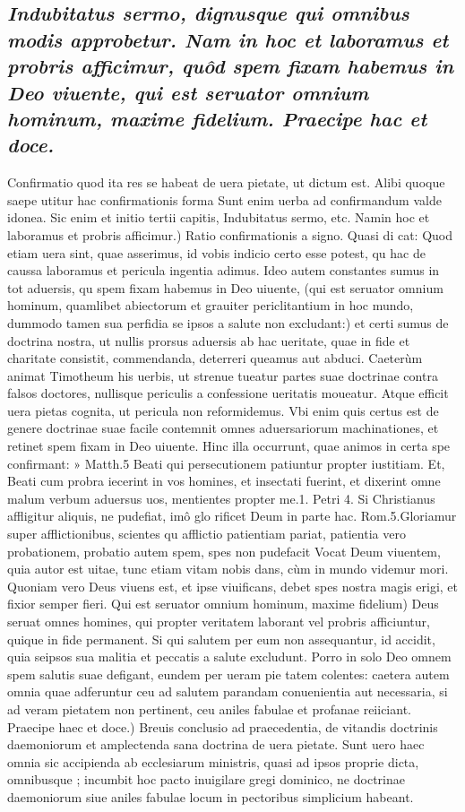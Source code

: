 \documentclass{article}
\begin{document}
\begin{pages}
\subsection*{\textit{Indubitatus sermo, dignusque qui omnibus modis approbetur. Nam in hoc et laboramus et probris afficimur, quôd spem fixam habemus in Deo viuente, qui est seruator omnium hominum, maxime fidelium. Praecipe hac et doce. }}\pstart Confirmatio quod ita res se habeat de uera pietate, ut dictum est. Alibi quoque saepe utitur hac confirmationis forma Sunt enim uerba ad confirmandum valde idonea. Sic enim et initio tertii capitis, Indubitatus sermo, etc.  \pend\pstart Namin hoc et laboramus et probris afficimur.) Ratio confirmationis a signo. Quasi di cat: Quod etiam uera sint, quae asserimus, id vobis indicio certo esse potest, qu hac de caussa laboramus et pericula ingentia adimus. Ideo autem constantes sumus in tot aduersis, qu spem fixam habemus in Deo uiuente, (qui est seruator omnium hominum, quamlibet abiectorum et grauiter periclitantium in hoc mundo, dummodo tamen sua perfidia se ipsos a salute non excludant:) et certi sumus de doctrina nostra, ut nullis prorsus aduersis ab hac ueritate, quae in fide et charitate consistit, commendanda, deterreri queamus aut abduci. Caeterùm animat Timotheum his uerbis, ut strenue tueatur partes suae doctrinae contra falsos doctores, nullisque periculis a confessione ueritatis moueatur. Atque  efficit uera pietas cognita, ut pericula non reformidemus. Vbi enim quis certus est de genere doctrinae suae facile contemnit omnes aduersariorum machinationes, et retinet spem fixam in Deo uiuente. Hinc illa occurrunt, quae animos in certa spe confirmant: » Matth.5 Beati qui persecutionem patiuntur propter iustitiam. Et, Beati cum probra iecerint in vos homines, et insectati fuerint, et dixerint omne malum verbum aduersus uos,  mentientes propter me.1. Petri 4. Si Christianus affligitur aliquis, ne pudefiat, imô glo  rificet Deum in parte hac. Rom.5.Gloriamur super afflictionibus, scientes qu afflictio  patientiam pariat, patientia vero probationem, probatio autem spem, spes non pudefacit Vocat Deum viuentem, quia autor est uitae, tunc etiam vitam nobis dans, cùm in mundo videmur mori. Quoniam vero Deus viuens est, et ipse viuificans, debet spes nostra magis erigi, et fixior semper fieri.  \pend\pstart Qui est seruator omnium hominum, maxime fidelium) Deus seruat omnes homines, qui propter veritatem laborant vel probris afficiuntur, quique in fide permanent. Si qui salutem per eum non assequantur, id accidit, quia seipsos sua malitia et peccatis a salute excludunt. Porro in solo Deo omnem spem salutis suae defigant, eundem per ueram pie tatem colentes: caetera autem omnia quae adferuntur ceu ad salutem parandam conuenientia aut necessaria, si ad veram pietatem non pertinent, ceu aniles fabulae et profanae reiiciant.  \pend\pstart Praecipe haec et doce.) Breuis conclusio ad praecedentia, de vitandis doctrinis daemoniorum et amplectenda sana doctrina de uera pietate. Sunt uero haec omnia sic accipienda ab ecclesiarum ministris, quasi ad ipsos proprie dicta, omnibusque ; incumbit hoc pacto inuigilare gregi dominico, ne doctrinae daemoniorum siue aniles fabulae locum in pectoribus simplicium habeant.  \pend

\end{pages}
\end{document}
